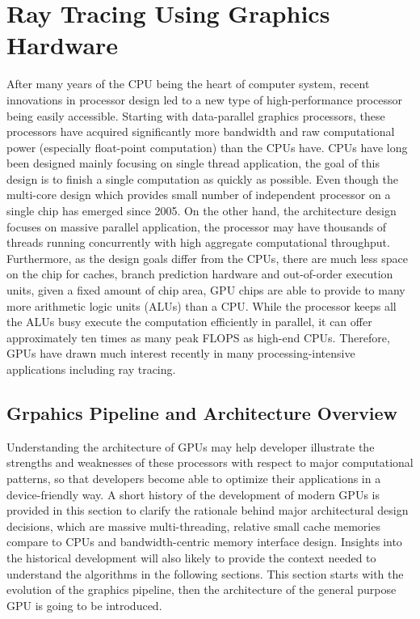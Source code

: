 \chapter{Ray Tracing Using Graphics Hardware}
\setcounter{figure}{1}      %
\label{ch:gpu}

After many years of the CPU being the heart of computer system, recent innovations in processor design led to a new type of high-performance processor being easily accessible. Starting with data-parallel graphics processors, these processors have acquired significantly more bandwidth and raw computational power (especially float-point computation) than the CPUs have. CPUs have long been designed mainly focusing on single thread application, the goal of this design is to finish a single computation as quickly as possible. Even though the multi-core design which provides small number of independent processor on a single chip has emerged since 2005. On the other hand, the architecture design focuses on massive parallel application, the processor may have thousands of threads running concurrently with high aggregate computational throughput. Furthermore, as the design goals differ from the CPUs, there are much less space on the chip for caches, branch prediction hardware and out-of-order execution units, given a fixed amount of chip area, GPU chips are able to provide to many more arithmetic logic units (ALUs) than a CPU. While the processor keeps all the ALUs busy execute the computation efficiently in parallel, it can offer approximately ten times as many peak FLOPS as high-end CPUs. Therefore, GPUs have drawn much interest recently in many processing-intensive applications including ray tracing. 

% 

\section{Grpahics Pipeline and Architecture Overview}
Understanding the architecture of GPUs may help developer illustrate the strengths and weaknesses of these processors with respect to major computational patterns, so that developers become able to optimize their applications in a device-friendly way. A short history of the development of modern GPUs is provided in this section to clarify the rationale behind major architectural design decisions, which are massive multi-threading, relative small cache memories compare to CPUs and bandwidth-centric memory interface design. Insights into the historical development will also likely to provide the context needed to understand the algorithms in the following sections. This section starts with the evolution of the graphics pipeline, then the architecture of the general purpose GPU is going to be introduced. 


